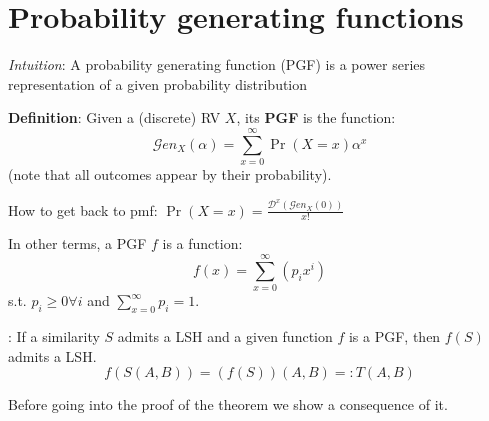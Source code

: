 \section{Probability generating functions}
	
	\textit{Intuition}: A probability generating function (PGF) is a power series representation of a given probability distribution
	
	\textbf{Definition}: Given a (discrete) RV $X$, its \textbf{PGF} is the function:
	\begin{equation}
		\mathcal{G}en_X(\alpha)= \sum_{x=0}^{\infty}\Pr(X=x)\alpha^x
	\end{equation}
	(note that all outcomes appear by their probability).
	
	How to get back to pmf: $\displaystyle \Pr(X=x) = \frac{\mathcal{D}^x(\mathcal{G}en_X(0))}{x!}$  %
	
	In other terms, a PGF $f$ is a function:
	\begin{equation}
		f(x)= \sum_{x=0}^{\infty}\left( p_i x^i \right)
	\end{equation}
	s.t. $p_i\geq 0 \forall i$ and $\sum_{x=0}^{\infty} p_i = 1$.
	
	\thm: If a similarity $S$ admits a LSH and a given function $f$ is a PGF, then $f(S)$ admits a LSH.
	\begin{equation*}
		f(S(A,B))=(f(S)) (A,B) =: T(A,B)
	\end{equation*}
	
	
	Before going into the proof of the theorem we show a consequence of it.
	
